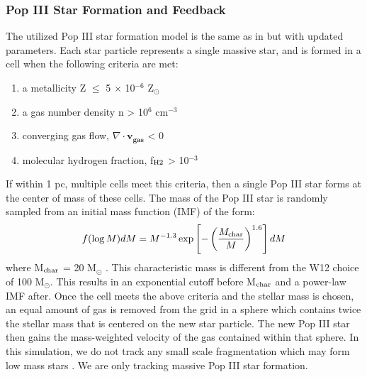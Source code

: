\documentclass[a4paper,fleqn,usenatbib]{mnras}
\begin{document}
\subsubsection{Pop III Star Formation and Feedback }
The utilized Pop III star formation model is the same as in \citet{Wise08_Gal} but with updated parameters. Each star particle represents a single massive star, and is formed in a cell when the following criteria are met: 
\begin{enumerate}
	\item a metallicity Z $\leq$ 5 $\times$ 10$^{-6}$ Z$_{\odot}$

	\item a gas number density n > 10$^{6}$ cm$^{-3}$

	\item converging gas flow, $\nabla \cdot \mathbf{v_{gas}}$ < 0 

	\item molecular hydrogen fraction, f$_{\rm H2}$ > 10$^{-3}$
\end{enumerate}

If within 1 pc, multiple cells meet this criteria, then a single Pop III star forms at the center of mass of these cells. The mass of the Pop III star is randomly sampled from an initial mass function (IMF) of the form:
\begin{equation} \label{IMF}
	f(\log M)dM = M^{-1.3} \exp \left[-\left( \frac{M_{\rm char}}{M}\right)^{1.6} \right]dM
\end{equation}
where M$_{\rm char}$ = 20 M$_{\odot}$ \citep{Hirano17}. This characteristic mass is different from the W12 choice of 100 M$_{\odot}$. This results in an exponential cutoff before M$_{\rm char}$ and a power-law IMF after. Once the cell meets the above criteria and the stellar mass is chosen, an equal amount of gas is removed from the grid in a sphere which contains twice the stellar mass that is centered on the new star particle. The new Pop III star then gains the mass-weighted velocity of the gas contained within that sphere. In this simulation, we do not track any small scale fragmentation which may form low mass stars \citep{Greif11_P3Cluster}. We are only tracking massive Pop III star formation.
\end{document}

